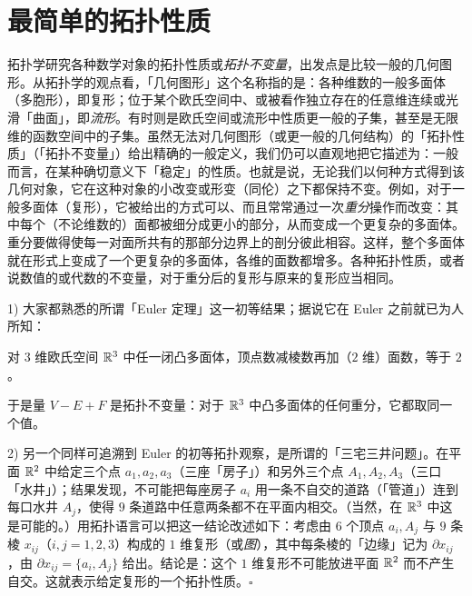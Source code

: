 \chapter{最简单的拓扑性质}


拓扑学研究各种数学对象的拓扑性质或\emph{拓扑不变量}，出发点是比较一般的几何图形。从拓扑学的观点看，「几何图形」这个名称指的是：各种维数的一般多面体（多胞形），即复形；位于某个欧氏空间中、或被看作独立存在的任意维连续或光滑「曲面」，即\emph{流形}。有时则是欧氏空间或流形中性质更一般的子集，甚至是无限维的函数空间中的子集。虽然无法对几何图形（或更一般的几何结构）的「拓扑性质」（「拓扑不变量」）给出精确的一般定义，我们仍可以直观地把它描述为：一般而言，在某种确切意义下「稳定」的性质。也就是说，无论我们以何种方式得到该几何对象，它在这种对象的小改变或形变（同伦）之下都保持不变。例如，对于一般多面体（复形），它被给出的方式可以、而且常常通过一次\emph{重分}操作而改变：其中每个（不论维数的）面都被细分成更小的部分，从而变成一个更复杂的多面体。重分要做得使每一对面所共有的那部分边界上的剖分彼此相容。这样，整个多面体就在形式上变成了一个更复杂的多面体，各维的面数都增多。各种拓扑性质，或者说数值的或代数的不变量，对于重分后的复形与原来的复形应当相同。


1) 大家都熟悉的所谓「Euler 定理」这一初等结果；据说它在 Euler 之前就已为人所知：

\begin{theorem*}{}
对 $3$ 维欧氏空间 $\mathbb{R}^3$ 中任一闭凸多面体，顶点数减棱数再加（$2$ 维）面数，等于 $2$。
\end{theorem*}

于是量 $V-E+F$ 是拓扑不变量：对于 $\mathbb{R}^3$ 中凸多面体的任何重分，它都取同一个值。

2) 另一个同样可追溯到 Euler 的初等拓扑观察，是所谓的「三宅三井问题」。在平面 $\mathbb{R}^2$ 中给定三个点 $a_1,a_2,a_3$（三座「房子」）和另外三个点 $A_1,A_2,A_3$（三口「水井」）；结果发现，不可能把每座房子 $a_i$ 用一条不自交的道路（「管道」）连到每口水井 $A_j$，使得 $9$ 条道路中任意两条都不在平面内相交。（当然，在 $\mathbb{R}^3$ 中这是可能的。）用拓扑语言可以把这一结论改述如下：考虑由 $6$ 个顶点 $a_i,A_j$ 与 $9$ 条棱 $x_{ij}$（$i,j=1,2,3$）构成的 $1$ 维复形（或\emph{图}），其中每条棱的「边缘」记为 $\partial x_{ij}$，由 $\partial x_{ij}=\{a_i,A_j\}$ 给出。结论是：这个 $1$ 维复形不可能放进平面 $\mathbb{R}^2$ 而不产生自交。这就表示给定复形的一个拓扑性质。\hfill$\square$

